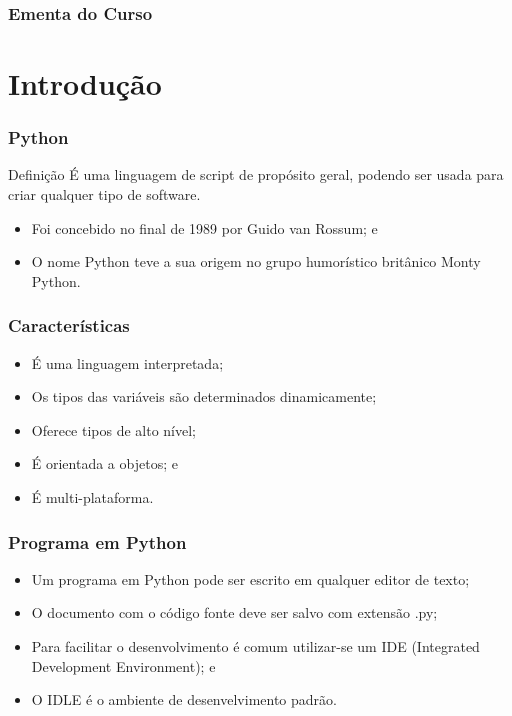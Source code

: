 \documentclass{beamer}
\begin{document}
\begin{frame}
	\frametitle{Ementa do Curso}
  	\tableofcontents
\end{frame}


\section{Introdução}

\begin{frame}
	\frametitle{Python}

	\begin{block}{Definição}
		É uma linguagem de script de propósito geral, podendo ser usada para criar
		qualquer tipo de software.
	\end{block}\vfill
	
	\begin{itemize}
		\item Foi concebido no final de 1989 por Guido van Rossum; e
		\item O nome Python teve a sua origem no grupo humorístico britânico
		Monty Python.
	\end{itemize}
\end{frame}

\begin{frame}
\frametitle{Características}

\begin{itemize}
	\item É uma linguagem interpretada;
	\item Os tipos das variáveis são determinados dinamicamente;
	\item Oferece tipos de alto nível;
	\item É orientada a objetos; e
	\item É multi-plataforma.
\end{itemize}
\end{frame}

\begin{frame}
\frametitle{Programa em Python}

\begin{itemize}
	\item Um programa em Python pode ser escrito em qualquer editor de texto;
	\item O documento com o código fonte deve ser salvo com extensão .py;
	\item Para facilitar o desenvolvimento é comum utilizar-se um IDE
	(Integrated Development Environment); e
	\item O IDLE é o ambiente de desenvelvimento padrão.
\end{itemize}
\end{frame}
\end{document}
